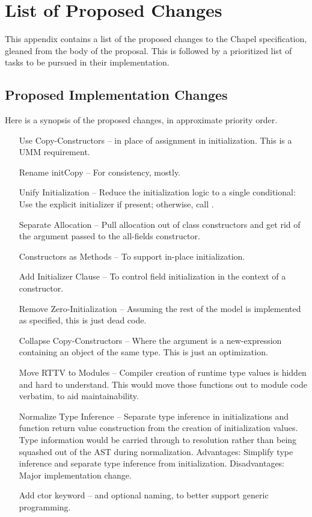 \section{List of Proposed Changes}
\label{Changes}

This appendix contains a list of the proposed changes to the Chapel specification,
gleaned from the body of the proposal.  This is followed by a prioritized list of tasks to
be pursued in their implementation.

\subsection{Proposed Implementation Changes}

Here is a synopsis of the proposed changes, in approximate priority order.

\begin{itemize}
\item[Use Copy-Constructors] -- in place of assignment in initialization.  This is a UMM requirement.
\item[Rename initCopy] -- For consistency, mostly.
\item[Unify Initialization] -- Reduce the initialization logic to a single conditional:
  Use the explicit initializer if present; otherwise, call .
\item[Separate Allocation] -- Pull allocation out of class constructors and get rid of the
   argument passed to the all-fields constructor.
\item[Constructors as Methods] -- To support in-place initialization.
\item[Add Initializer Clause] -- To control field initialization in the context of a
  constructor.
\item[Remove Zero-Initialization] -- Assuming the rest of the model is implemented as
  specified, this is just dead code.
\item[Collapse Copy-Constructors] -- Where the argument is a new-expression containing
  an object of the same type.  This is just an optimization.
\item[Move RTTV to Modules] -- Compiler creation of runtime type values is hidden and hard
  to understand.  This would move those functions out to module code verbatim, to aid
  maintainability.
\item[Normalize Type Inference] -- Separate type inference in initializations and function
  return value construction from the creation of initialization values.  Type information
  would be carried through to resolution rather than being squashed out of the AST during
  normalization.  Advantages: Simplify type inference and separate type inference from
  initialization.  Disadvantages: Major implementation change.
\item[Add ctor keyword] -- and optional naming, to better support generic
  programming.
\end{itemize}

